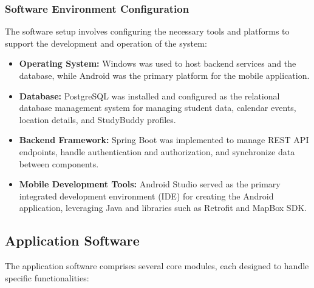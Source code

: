 \documentclass[12pt]{article}
\begin{document}
\subsubsection{Software Environment Configuration}  
The software setup involves configuring the necessary tools and platforms to support the development and operation of the system:  
\begin{itemize}  
    \item \textbf{Operating System: }Windows was used to host backend services and the database, while Android was the primary platform for the mobile application.  
    \item \textbf{Database: }PostgreSQL was installed and configured as the relational database management system for managing student data, calendar events, location details, and StudyBuddy profiles.  
    \item \textbf{Backend Framework: }Spring Boot was implemented to manage REST API endpoints, handle authentication and authorization, and synchronize data between components.  
    \item \textbf{Mobile Development Tools: }Android Studio served as the primary integrated development environment (IDE) for creating the Android application, leveraging Java and libraries such as Retrofit and MapBox SDK.  
\end{itemize}

\pagebreak

\subsection{Application Software}  
The application software comprises several core modules, each designed to handle specific functionalities:  
\end{document}
